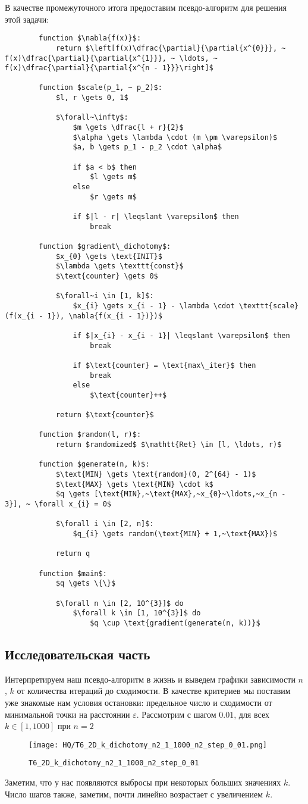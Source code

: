 \documentclass[12pt, a4paper, oneside, final]{article}
\begin{document}
	В качестве промежуточного итога предоставим псевдо-алгоритм для решения этой задачи:
	\begin{lstlisting}
		function $\nabla{f(x)}$:
			return $\left[f(x)\dfrac{\partial}{\partial{x^{0}}}, ~ f(x)\dfrac{\partial}{\partial{x^{1}}}, ~ \ldots, ~ f(x)\dfrac{\partial}{\partial{x^{n - 1}}}\right]$

		function $scale(p_1, ~ p_2)$:
			$l, r \gets 0, 1$

			$\forall~\infty$:
				$m \gets \dfrac{l + r}{2}$
				$\alpha \gets \lambda \cdot (m \pm \varepsilon)$
				$a, b \gets p_1 - p_2 \cdot \alpha$

				if $a < b$ then
					$l \gets m$
				else
					$r \gets m$

				if $|l - r| \leqslant \varepsilon$ then
					break

		function $gradient\_dichotomy$:
			$x_{0} \gets \text{INIT}$
			$\lambda \gets \texttt{const}$
			$\text{counter} \gets 0$

			$\forall~i \in [1, k]$:
				$x_{i} \gets x_{i - 1} - \lambda \cdot \texttt{scale}(f(x_{i - 1}), \nabla{f(x_{i - 1})})$

				if $|x_{i} - x_{i - 1}| \leqslant \varepsilon$ then
					break

				if $\text{counter} = \text{max\_iter}$ then
					break
				else
					$\text{counter}++$

			return $\text{counter}$

		function $random(l, r)$:
			return $randomized$ $\mathtt{Ret} \in [l, \ldots, r)$

		function $generate(n, k)$:
			$\text{MIN} \gets \text{random}(0, 2^{64} - 1)$
			$\text{MAX} \gets \text{MIN} \cdot k$
			$q \gets [\text{MIN},~\text{MAX},~x_{0}~\ldots,~x_{n - 3}], ~ \forall x_{i} = 0$

			$\forall i \in [2, n]$:
				$q_{i} \gets random(\text{MIN} + 1,~\text{MAX})$

			return q

		function $main$:
			$q \gets \{\}$

			$\forall n \in [2, 10^{3}]$ do
				$\forall k \in [1, 10^{3}]$ do
					$q \cup \text{gradient(generate(n, k))}$
	\end{lstlisting}
	\subsection*{Исследовательская часть}
	Интерпретируем наш псевдо-алгоритм в жизнь и выведем графики зависимости $n$, $k$ от количества итераций до сходимости. В качестве критериев мы поставим уже знакомые нам условия остановки: предельное число и сходимости от минимальной точки на расстоянии $\varepsilon$. Рассмотрим с шагом $0.01$, для всех $k \in [1, 1000]$ при $n = 2$
	\begin{figure}[H]
		\centering
	 	\texttt{[image: HQ/T6\_2D\_k\_dichotomy\_n2\_1\_1000\_n2\_step\_0\_01.png]}
		\caption*{\texttt{T6\_2D\_k\_dichotomy\_n2\_1\_1000\_n2\_step\_0\_01}}
	\end{figure}
	Заметим, что у нас появляются выбросы при некоторых больших значениях $k$. Число шагов также, заметим, почти линейно возрастает с увеличением $k$.
\end{document}
